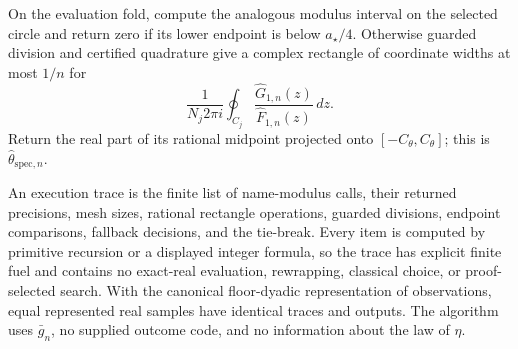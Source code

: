 On the evaluation fold, compute the analogous modulus interval on the selected circle and return zero if its lower endpoint is below \(a_{\star}/4\).  Otherwise guarded division and certified quadrature give a complex rectangle of coordinate widths at most \(1/n\) for
\[
 \frac{1}{N_j2\pi i}\oint_{C_j}
 \frac{\widehat G_{1,n}(z)}{\widehat F_{1,n}(z)}\,dz.
\]
Return the real part of its rational midpoint projected onto \([-C_{\theta},C_{\theta}]\); this is \(\widehat\theta_{\mathrm{spec},n}\).

An execution trace is the finite list of name-modulus calls, their returned precisions, mesh sizes, rational rectangle operations, guarded divisions, endpoint comparisons, fallback decisions, and the tie-break.  Every item is computed by primitive recursion or a displayed integer formula, so the trace has explicit finite fuel and contains no exact-real evaluation, rewrapping, classical choice, or proof-selected search.  With the canonical floor-dyadic representation of observations, equal represented real samples have identical traces and outputs.  The algorithm uses \(\bar g_n\), no supplied outcome code, and no information about the law of \(\eta\).